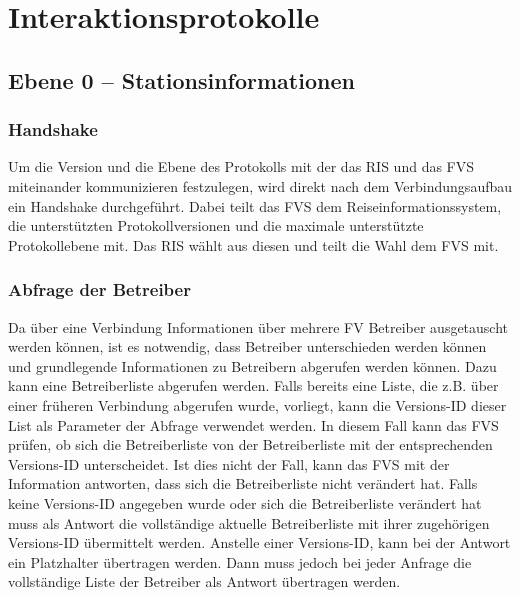 \chapter{Interaktionsprotokolle}
\label{sec:Interaktionsprotokolle}

\section{Ebene 0 -- Stationsinformationen}

\subsection{Handshake}
Um die Version und die Ebene des Protokolls mit der das RIS und das FVS miteinander kommunizieren festzulegen, wird direkt nach dem Verbindungsaufbau ein Handshake durchgeführt. Dabei teilt das FVS dem Reiseinformationssystem, die unterstützten Protokollversionen und die maximale unterstützte Protokollebene mit. Das RIS wählt aus diesen und teilt die Wahl dem FVS mit.

\subsection{Abfrage der Betreiber}
Da über eine Verbindung Informationen über mehrere FV Betreiber ausgetauscht werden können, ist es notwendig, dass Betreiber unterschieden werden können und grundlegende Informationen zu Betreibern abgerufen werden können. Dazu kann eine Betreiberliste abgerufen werden. Falls bereits eine Liste, die z.B. über einer früheren Verbindung abgerufen wurde, vorliegt, kann die Versions-ID dieser List als Parameter der Abfrage verwendet werden. In diesem Fall kann das FVS prüfen, ob sich die Betreiberliste von der Betreiberliste mit der entsprechenden Versions-ID unterscheidet. Ist dies nicht der Fall, kann das FVS mit der Information antworten, dass sich die Betreiberliste nicht verändert hat. Falls keine Versions-ID angegeben wurde oder sich die Betreiberliste verändert hat muss als Antwort die vollständige aktuelle Betreiberliste mit ihrer zugehörigen Versions-ID übermittelt werden. Anstelle einer Versions-ID, kann bei der Antwort ein Platzhalter übertragen werden. Dann muss jedoch bei jeder Anfrage die vollständige Liste der Betreiber als Antwort übertragen werden.


